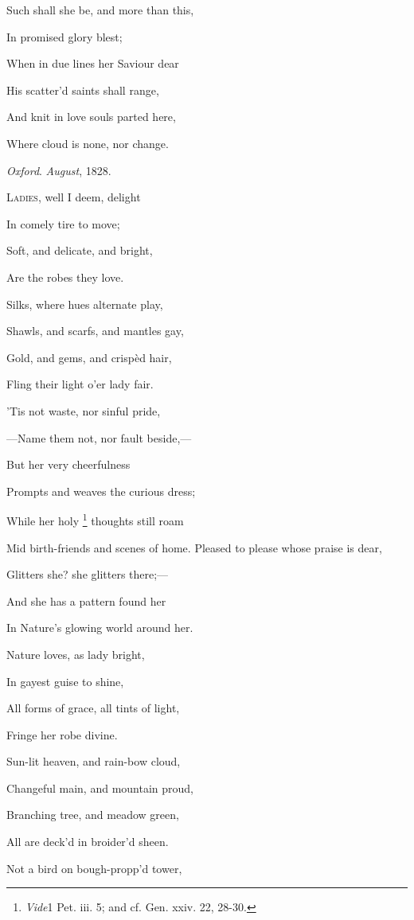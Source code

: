 Such shall she be, and more than this,

In promised glory blest;

When in due lines her Saviour dear

His scatter'd saints shall range,

And knit in love souls parted here,

Where cloud is none, nor change.

\emph{Oxford}.
\emph{August}, 1828.


L\textsc{adies}, well I deem, delight

In comely tire to
move;

Soft, and delicate, and bright,

Are the robes they
love.

Silks, where hues alternate play,

Shawls, and scarfs, and mantles gay,

Gold, and gems, and crispèd hair,

Fling their light o'er lady fair.

'Tis not waste, nor sinful pride,

—Name them not, nor fault beside,—

But her very cheerfulness

Prompts and weaves the curious dress;

While her holy \footnote{\emph{Vide}1 Pet. iii. 5; and cf. Gen. xxiv. 22, 28-30.} thoughts still roam

Mid birth-friends and scenes of home. Pleased to please whose praise is dear,

Glitters she? she glitters there;—

And she has a pattern found her

In Nature's glowing world around her.

Nature loves, as lady bright,

In gayest guise to shine,

All forms of grace, all tints of light,

Fringe her robe divine.

Sun-lit heaven, and rain-bow cloud,

Changeful main, and mountain proud,

Branching tree, and meadow green,

All are deck'd in broider'd sheen.

Not a bird on bough-propp'd tower,

